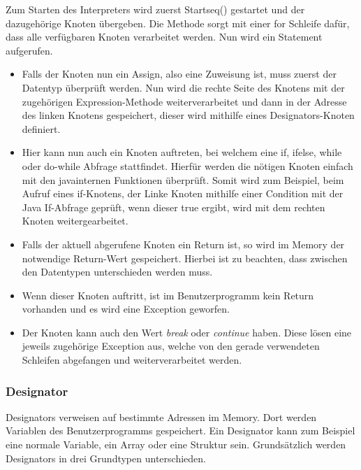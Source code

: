 Zum Starten des Interpreters wird zuerst Startseq() gestartet und der dazugehörige Knoten übergeben. Die Methode sorgt mit einer for Schleife dafür, dass alle verfügbaren Knoten verarbeitet werden. Nun wird ein Statement aufgerufen. 
\begin{itemize}
\item Falls der Knoten nun ein Assign, also eine Zuweisung ist, muss zuerst der Datentyp überprüft werden. Nun wird die rechte Seite des Knotens mit der zugehörigen Expression-Methode weiterverarbeitet und dann in der Adresse des linken Knotens gespeichert, dieser wird mithilfe eines Designators-Knoten definiert.
\item Hier kann nun auch ein Knoten auftreten, bei welchem eine if, ifelse, while oder do-while Abfrage stattfindet. Hierfür werden die nötigen Knoten einfach mit den javainternen Funktionen überprüft. Somit wird zum Beispiel, beim Aufruf eines if-Knotens, der Linke Knoten mithilfe einer Condition mit der Java If-Abfrage geprüft, wenn dieser true ergibt, wird mit dem rechten Knoten weitergearbeitet.
\item Falls der aktuell abgerufene Knoten ein Return ist, so wird im Memory der notwendige Return-Wert gespeichert. Hierbei ist zu beachten, dass zwischen den Datentypen unterschieden werden muss.
\item Wenn dieser Knoten auftritt, ist im Benutzerprogramm kein Return vorhanden und es wird eine Exception geworfen.
\item Der Knoten kann auch den Wert \textit{break} oder \textit{continue} haben. Diese lösen eine jeweils zugehörige Exception aus, welche von den gerade verwendeten Schleifen abgefangen und weiterverarbeitet werden.
\end{itemize}

\subsubsection{Designator}
Designators verweisen auf bestimmte Adressen im Memory. Dort werden Variablen des Benutzerprogramms gespeichert. Ein Designator kann zum Beispiel eine normale Variable, ein Array oder eine Struktur sein. Grundsätzlich werden Designators in drei Grundtypen unterschieden.

